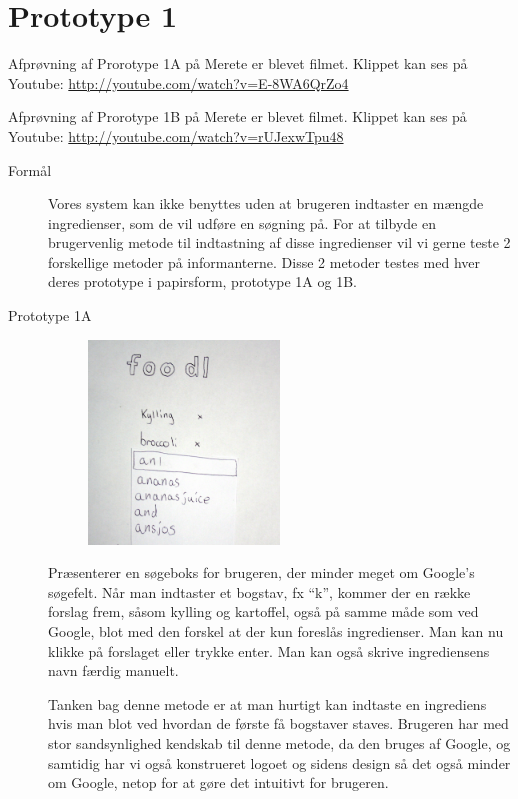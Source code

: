 \section{Prototype 1}
\label{ap:prototype1}

Afprøvning af Prorotype 1A på Merete er blevet filmet. Klippet kan ses på Youtube: \url{http://youtube.com/watch?v=E-8WA6QrZo4}

Afprøvning af Prorotype 1B på Merete er blevet filmet. Klippet kan ses på Youtube: \url{http://youtube.com/watch?v=rUJexwTpu48}

\begin{description}
\item[Formål] Vores system kan ikke benyttes uden at brugeren indtaster en mængde ingredienser, som de vil udføre en søgning på. For at tilbyde en brugervenlig metode til indtastning af disse ingredienser vil vi gerne teste 2 forskellige metoder på informanterne. Disse 2 metoder testes med hver deres prototype i papirsform, prototype 1A og 1B.
\item[Prototype 1A]

\begin{figure}[H]
\centering
\includegraphics[width=0.5\textwidth]{billeder/prototyper/prototype1a.jpg}
\label{fig:prototype1a}
\end{figure}

Præsenterer en søgeboks for brugeren, der minder meget om Google’s søgefelt. Når man indtaster et bogstav, fx “k”, kommer der en række forslag frem, såsom kylling og kartoffel, også på samme måde som ved Google, blot med den forskel at der kun foreslås ingredienser. Man kan nu klikke på forslaget eller trykke enter. Man kan også skrive ingrediensens navn færdig manuelt.

Tanken bag denne metode er at man hurtigt kan indtaste en ingrediens hvis man blot ved hvordan de første få bogstaver staves. Brugeren har med stor sandsynlighed kendskab til denne metode, da den bruges af Google, og samtidig har vi også konstrueret logoet og sidens design så det også minder om Google, netop for at gøre det intuitivt for brugeren.


\end{description}
